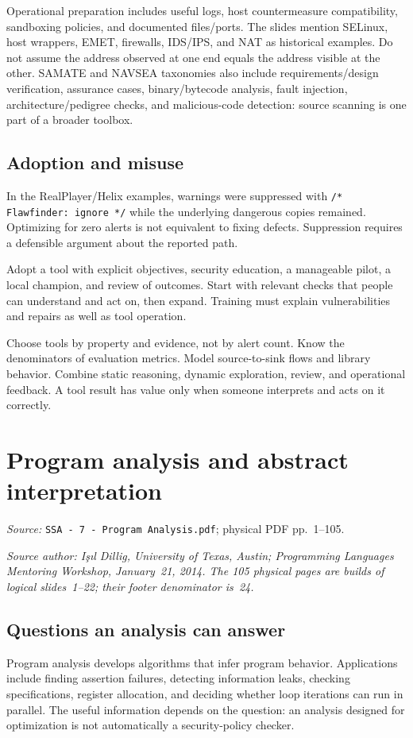 \documentclass[11pt,a4paper]{article}
\newcommand{\currentmodule}{Contents}
\newcommand{\source}[2]{\textcolor{muted}{\small\textit{Source:} \nolinkurl{#1}; physical PDF pp.~#2.}\par\medskip}
\newcommand{\module}[2]{\par\Needspace{8\baselineskip}\gdef\currentmodule{#1}\section{#1}\label{#2}}
\numberwithin{figure}{section}
\begin{document}
Operational preparation includes useful logs, host countermeasure compatibility, sandboxing policies, and documented files/ports. The slides mention SELinux, host wrappers, EMET, firewalls, IDS/IPS, and NAT as historical examples. Do not assume the address observed at one end equals the address visible at the other. SAMATE and NAVSEA taxonomies also include requirements/design verification, assurance cases, binary/bytecode analysis, fault injection, architecture/pedigree checks, and malicious-code detection: source scanning is one part of a broader toolbox.

\subsection{Adoption and misuse}
In the RealPlayer/Helix examples, warnings were suppressed with \texttt{/* Flawfinder: ignore */} while the underlying dangerous copies remained. Optimizing for zero alerts is not equivalent to fixing defects. Suppression requires a defensible argument about the reported path.

Adopt a tool with explicit objectives, security education, a manageable pilot, a local champion, and review of outcomes. Start with relevant checks that people can understand and act on, then expand. Training must explain vulnerabilities and repairs as well as tool operation.

\begin{takeaway}
Choose tools by property and evidence, not by alert count. Know the denominators of evaluation metrics. Model source-to-sink flows and library behavior. Combine static reasoning, dynamic exploration, review, and operational feedback. A tool result has value only when someone interprets and acts on it correctly.
\end{takeaway}

\module{Program analysis and abstract interpretation}{sec:analysis}
\source{SSA - 7 - Program Analysis.pdf}{1--105}
\textit{Source author: I\c{s}\i l Dillig, University of Texas, Austin; Programming Languages Mentoring Workshop, January~21, 2014. The 105 physical pages are builds of logical slides~1--22; their footer denominator is~24.}

\subsection{Questions an analysis can answer}
Program analysis develops algorithms that infer program behavior. Applications include finding assertion failures, detecting information leaks, checking specifications, register allocation, and deciding whether loop iterations can run in parallel. The useful information depends on the question: an analysis designed for optimization is not automatically a security-policy checker.
\end{document}
